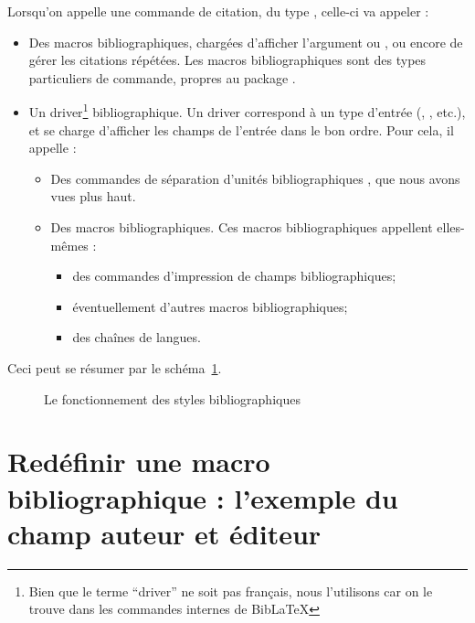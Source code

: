 Lorsqu'on appelle une commande de citation, du type , celle-ci va appeler :
    \begin{itemize}
        \item Des macros bibliographiques, chargées d'afficher l'argument  ou , ou encore de gérer les citations répétées. Les macros bibliographiques sont des types particuliers de commande, propres au package .\label{macrobiblio} 
        \item Un driver\footnote{Bien que le terme \enquote{driver} ne soit pas français, nous l'utilisons car on le trouve dans les commandes internes de BibLaTeX} bibliographique. Un driver correspond à un type d'entrée (, , etc.), et se charge d'afficher les champs de l'entrée dans le bon ordre. Pour cela, il appelle :
        \begin{itemize}
            \item Des commandes de séparation d'unités bibliographiques
, que nous avons vues plus haut.
            \item Des macros bibliographiques. Ces macros bibliographiques appellent elles-mêmes :
            \begin{itemize}
                \item des commandes d'impression de champs bibliographiques;
                \item éventuellement d'autres macros bibliographiques;
                \item des chaînes de langues.
            \end{itemize}
        \end{itemize}
        
    \end{itemize}

Ceci peut se résumer par le schéma~\ref{schemastylesbiblios}. 

\begin{figure}[ht]

\caption{Le fonctionnement des styles bibliographiques}\label{schemastylesbiblios}
\end{figure}



\section[Redéfinir une macro bibliographique]{Redéfinir une macro bibliographique : l'exemple du champ auteur et éditeur}


